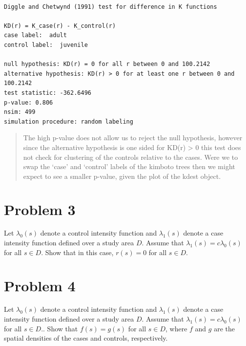 \documentclass[
  letterpaper,
  DIV=11,
  numbers=noendperiod]{scrartcl}
\begin{document}
\begin{verbatim}

Diggle and Chetwynd (1991) test for difference in K functions

KD(r) = K_case(r) - K_control(r)
case label:  adult 
control label:  juvenile 

null hypothesis: KD(r) = 0 for all r between 0 and 100.2142 
alternative hypothesis: KD(r) > 0 for at least one r between 0 and 100.2142 
test statistic: -362.6496 
p-value: 0.806 
nsim: 499 
simulation procedure: random labeling
\end{verbatim}

\begin{quote}
The high p-value does not allow us to reject the null hypothesis,
however since the alternative hypothesis is one sided for KD(r)
\textgreater{} 0 this test does not check for clustering of the controls
relative to the cases. Were we to swap the `case' and `control' labels
of the kimboto trees then we might expect to see a smaller p-value,
given the plot of the kdest object.
\end{quote}

\hypertarget{problem-3}{%
\section{Problem 3}\label{problem-3}}

Let \(\lambda_0(s)\) denote a control intensity function and
\(\lambda_1(s)\) denote a case intensity function defined over a study
area \(D\). Assume that \(\lambda_1(s)=c\lambda_0(s)\) for all
\(s\in D\). Show that in this case, \(r(s)=0\) for all \(s\in D\).

\hypertarget{problem-4}{%
\section{Problem 4}\label{problem-4}}

Let \(\lambda_0(s)\) denote a control intensity function and
\(\lambda_1(s)\) denote a case intensity function defined over a study
area \(D\). Assume that \(\lambda_1(s)=c\lambda_0(s)\) for all
\(s\in D\).. Show that \(f(s)=g(s)\) for all \(s\in D\), where \(f\) and
\(g\) are the spatial densities of the cases and controls, respectively.
\end{document}
